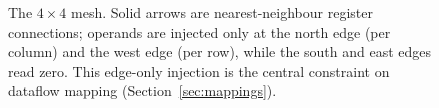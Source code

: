 \begin{figure}[t]
  \centering
  \resizebox{0.94\columnwidth}{!}{}
  \caption{The $4\times4$ mesh. Solid arrows are nearest-neighbour register
  connections; operands are injected only at the north edge (per column) and
  the west edge (per row), while the south and east edges read zero. This
  edge-only injection is the central constraint on dataflow mapping
  (Section~\ref{sec:mappings}).}
  \label{fig:array}
\end{figure}
